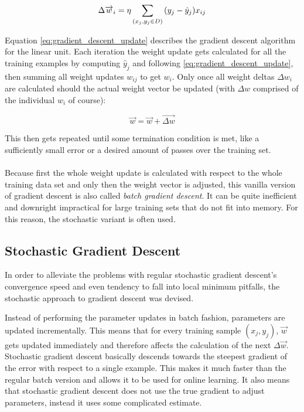 \begin{equation}
  \Delta \overrightarrow{w}_i = \eta \sum_{(x_j, y_j \in D)} \\
  (y_j - \hat{y}_j) x_{ij}
  \label{eq:gradient_descent_update}
\end{equation}

Equation \ref{eq:gradient_descent_update}
describes the gradient descent algorithm for the linear unit.
Each iteration the weight update gets calculated
for all the training examples by computing $\hat{y}_j$
and following \ref{eq:gradient_descent_update},
then summing all weight updates $w_{ij}$
to get $w_i$.
Only once all weight deltas $\Delta w_i$
are calculated should the actual weight vector be updated
(with $\Delta w$ comprised of the individual $w_i$ of course):

\begin{equation}
  \overrightarrow{w} = \overrightarrow{w} + \overrightarrow{\Delta w}
\end{equation}

This then gets repeated until some termination condition is met,
like a sufficiently small error or a desired amount of passes
over the training set.

\paragraph{}
Because first the whole weight update is calculated
with respect to the whole training data set
and only then the weight vector is adjusted,
this vanilla version of gradient descent is also
called \textit{batch gradient descent}.
It can be quite inefficient and downright
impractical for large training sets that do not fit into memory.
For this reason,
the stochastic variant is often used.

\subsection{Stochastic Gradient Descent}
In order to alleviate the problems
with regular stochastic gradient descent's
convergence speed and even tendency to fall
into local minimum pitfalls,
the stochastic approach to gradient descent was devised.

Instead of performing the parameter updates in batch fashion,
parameters are updated incrementally.
This means that for every training sample $(x_j, y_j)$,
$\overrightarrow{w}$
gets updated immediately
and therefore affects the calculation of the next
$\Delta \overrightarrow{w}$.
Stochastic gradient descent basically descends towards the steepest
gradient of the error with respect to a single example.
This makes it much faster than the regular batch version
and allows it to be used for online learning.
It also means that stochastic gradient descent
does not use the true gradient to adjust parameters,
instead it uses some complicated estimate.


